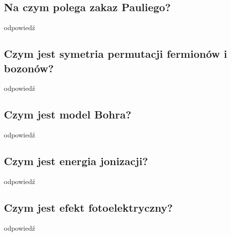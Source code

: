 \subsection{Na czym polega zakaz Pauliego?}

odpowiedź

\subsection{Czym jest symetria permutacji fermionów i bozonów?}

odpowiedź

\subsection{Czym jest model Bohra?}

odpowiedź

\subsection{Czym jest energia jonizacji?}

odpowiedź

\subsection{Czym jest efekt fotoelektryczny?}

odpowiedź
